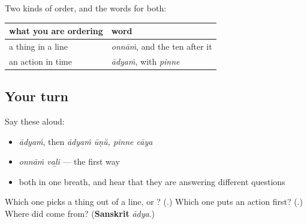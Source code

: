 \begin{grammarlens}[title={What you've built}]
Two kinds of order, and the words for both:

\noindent
\begin{tabularx}{\linewidth}{@{}>{\raggedright\arraybackslash}X>{\raggedright\arraybackslash}X@{}}
\toprule
\textbf{what you are ordering} & \textbf{word} \\
\midrule
a thing in a line & \textbf{\ml{ഒന്നാം}} \emph{onnāṁ}, and the ten after it \\
an action in time & \textbf{\ml{ആദ്യം}} \emph{ādyaṁ}, with \textbf{\ml{പിന്നെ}} \emph{pinne} \\
\bottomrule
\end{tabularx}
\end{grammarlens}

\subsection*{Your turn}
Say these aloud:

\begin{itemize}
\raggedright
  \item \emph{ādyaṁ}, then \emph{ādyaṁ ūṇŭ, pinne cāya}
  \item \emph{onnāṁ vaḻi} — the first way
  \item both in one breath, and hear that they are answering different questions
\end{itemize}

\begin{tcolorbox}[breakable,colback=teal!4,colframe=teal!35!black,title={Before you move on}]
Which one picks a thing out of a line,  or ? (\textbf{}.) Which one puts an action first? (\textbf{}.) Where did  come from? (\textbf{Sanskrit} \emph{ādya}.)
\end{tcolorbox}
